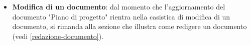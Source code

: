\begin{itemize}
	\item \textbf{Modifica di un documento}: dal momento che
	      l'aggiornamento del documento "Piano di progetto" rientra nella
	      casistica di modifica di un documento, si rimanda alla sezione
	      che illustra come redigere un documento (vedi
	      \ref{redazione-documento}).
\end{itemize}
